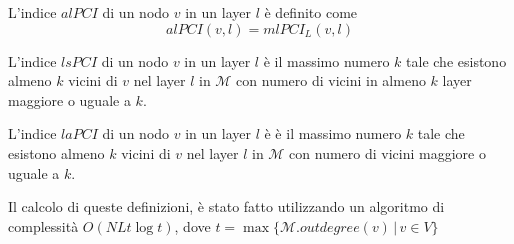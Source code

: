 \begin{definizione}[\alPCI]
    L'indice $alPCI$ di un nodo $v$ in un layer $l$ è definito come 
    \begin{equation}
        alPCI(v, l) = mlPCI_L(v, l)
    \end{equation}
\end{definizione}


\begin{definizione}[\lsPCI]
    L'indice $lsPCI$ di un nodo $v$ in un layer $l$ è il massimo numero $k$ 
    tale che esistono almeno $k$ vicini di $v$ nel layer $l$ in $\mathcal{M}$
    con numero di vicini in almeno $k$ layer maggiore o uguale a $k$.
\end{definizione}

\begin{definizione}[\laPCI]
    L'indice $laPCI$ di un nodo $v$ in un layer $l$ è 
    è il massimo numero $k$ tale che esistono almeno $k$ vicini di $v$ nel layer 
    $l$ in $\mathcal{M}$
    con numero di vicini maggiore o uguale a $k$.
\end{definizione}



Il calcolo di queste definizioni, è stato fatto utilizzando un algoritmo di complessità 
$O(N L t \log{t})$, dove $t = \max{\{\mathcal{M}.outdegree(v)\,|\,v \in V\}}$ 
